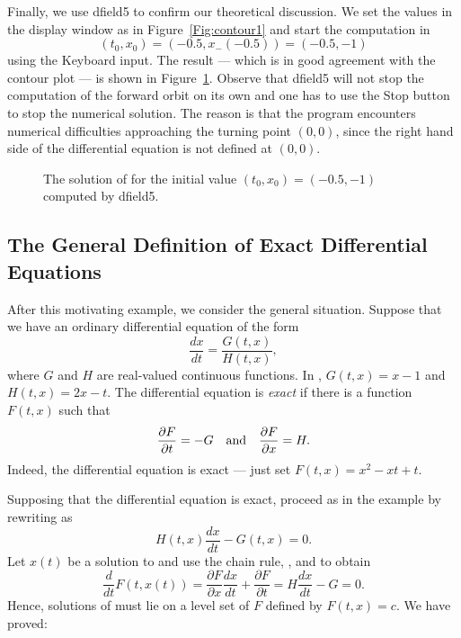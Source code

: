 \documentclass{ximera}
\begin{document}
Finally, we use {\sf dfield5} to confirm our 
theoretical discussion.  We set the values in {\sf the display window}
as in Figure~\ref{Fig:contour1} and start the computation in 
\[
(t_0,x_0)=(-0.5,x_-(-0.5))=(-0.5,-1)
\]
using the {\sf Keyboard input}.  The result --- which is in good
agreement with the contour plot --- is shown in
Figure~\ref{Fig:contour2}.  Observe that {\sf dfield5} will not 
stop the computation of the forward orbit on its own and one has to
use the {\sf Stop} button to stop the numerical solution.  The reason is
that the program encounters numerical difficulties approaching the turning
point $(0,0)$, since the right hand side of the differential equation is
not defined at $(0,0)$.

\begin{figure}[htb]
  \centerline{%
  }
  \caption{The solution of \protect{} for the
  initial value $(t_0,x_0)=(-0.5,-1)$ computed by {\sf dfield5}.}
  \label{Fig:contour2}
\end{figure}

\subsection*{The General Definition of Exact Differential Equations}

After this motivating example, we consider the general
situation.  Suppose that we have an ordinary differential
equation of the form
\begin{equation} \label{eq:exact}
\frac{dx}{dt} = \frac{G(t,x)}{H(t,x)},
\end{equation}
where $G$ and $H$ are real-valued continuous functions.  In 
, $G(t,x)=x-1$ and $H(t,x) = 2x-t$.
The differential equation  is {\em exact\/} 
 if
there is a function $F(t,x)$ such that
\begin{equation}  \label{e:FGH}
\frac{\partial F}{\partial t} = -G \AND
\frac{\partial F}{\partial x} =  H.
\end{equation}
Indeed, the differential equation  is exact --- just set 
$F(t,x) = x^2 - xt + t$.

Supposing that the differential equation  is exact, proceed as 
in the example by rewriting  as 
\begin{equation} \label{eq:exacta}
H(t,x)\frac{dx}{dt} - G(t,x) = 0.
\end{equation}
Let $x(t)$ be a solution to  and use the chain rule, 
, and  to obtain
\[
\frac{d}{dt} F(t,x(t)) = \frac{\partial F}{\partial x}\frac{dx}{dt} + 
\frac{\partial F}{\partial t} = H\frac{dx}{dt}-G = 0.
\]
Hence, solutions of  must lie on a level set of $F$ defined 
by $F(t,x) = c$. We have proved:
\end{document}
